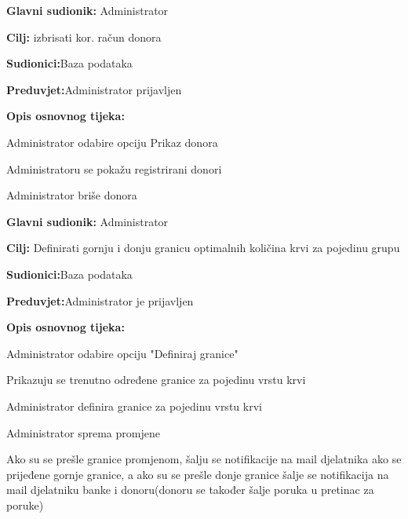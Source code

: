 \eject 
\noindent {}
\begin{packed_item}
	
	\item \textbf{Glavni sudionik: }{Administrator}
	\item  \textbf{Cilj:} {izbrisati kor. račun donora}
	\item  \textbf{Sudionici:}{Baza podataka}
	\item  \textbf{Preduvjet:}{Administrator prijavljen}
	\item  \textbf{Opis osnovnog tijeka:}
	
	\item[] \begin{packed_enum}
		
		\item {Administrator odabire opciju Prikaz donora}
		\item {Administratoru se pokažu registrirani donori} 
		\item {Administrator briše donora}
		
	\end{packed_enum}
	
\end{packed_item}

\noindent {}
\begin{packed_item}
	
	\item \textbf{Glavni sudionik: }{Administrator}
	\item  \textbf{Cilj:} {Definirati gornju i donju granicu optimalnih količina krvi za pojedinu grupu}
	\item  \textbf{Sudionici:}{Baza podataka}
	\item  \textbf{Preduvjet:}{Administrator je prijavljen}
	\item  \textbf{Opis osnovnog tijeka:}
	
	\item[] \begin{packed_enum}
		
		\item {Administrator odabire opciju "Definiraj granice"}
		\item {Prikazuju se trenutno određene granice za pojedinu vrstu krvi} 
		\item {Administrator definira granice za pojedinu vrstu krvi}
		\item {Administrator sprema promjene}
		\item {Ako su se prešle granice promjenom, šalju se notifikacije na mail djelatnika ako se prijeđene gornje granice, a ako su se prešle donje granice šalje se notifikacija na mail djelatniku banke i donoru(donoru se također šalje poruka u pretinac za poruke)}
		
	\end{packed_enum}
\end{packed_item}

